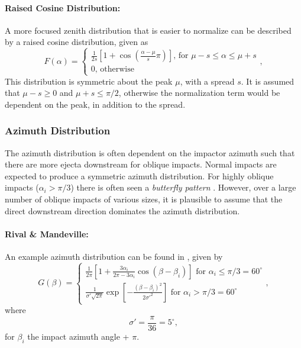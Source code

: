 \documentclass{article}
\begin{document}
\paragraph{Raised Cosine Distribution:}
A more focused zenith distribution that is easier to normalize can be described by a raised cosine distribution, given as
\begin{equation}\label{eq:zenith-rasied cosine dist}
F(\alpha) = \begin{cases}
\frac{1}{2s}\left[1 + \cos\left(\frac{\alpha-\mu}{s}\pi\right)\right] \text{, for $\mu-s \le \alpha \le \mu+s$}\\
0 \text{, otherwise}
\end{cases},
\end{equation}
This distribution is symmetric about the peak $\mu$, with a spread $s$. It is assumed that $\mu-s \ge 0$ and $\mu+s \le \pi/2$, otherwise the normalization term would be dependent on the peak, in addition to the spread.

\subsubsection{Azimuth Distribution}\label{sssec:Ejecta:Azimuth Distribution}

The azimuth distribution is often dependent on the impactor azimuth such that there are more ejecta downstream for oblique impacts. Normal impacts are expected to produce a symmetric azimuth distribution. For highly oblique impacts ($\alpha_i > \pi/3$) there is often seen a \textit{butterfly pattern} \citep{shuvalov2011ejecta}. However, over a large number of oblique impacts of various sizes, it is plausible to assume that the direct downstream direction dominates the azimuth distribution.

\paragraph{Rival \& Mandeville:}
An example azimuth distribution can be found in \cite{rival1999modeling}, given by
\begin{equation}\label{eq:azm_rival_mandeville}
G(\beta) =
\begin{cases}
\frac{1}{2\pi}\left[1+\frac{3\alpha_i}{2\pi - 3\alpha_i}\cos(\beta-\beta_i)\right] \text{  for $\alpha_i\le \pi/3 = 60^\circ$}\\
\frac{1}{\sigma'\sqrt{2\pi}}\exp\left[-\frac{(\beta-\beta_i)^2}{2\sigma'^2}\right]
\text{  for $\alpha_i > \pi/3 = 60^\circ$}
\end{cases},
\end{equation}
where
\begin{equation}
\sigma' = \frac{\pi}{36} = 5^\circ, 
\end{equation}
for $\beta_i$ the impact azimuth angle + $\pi$.
\end{document}
